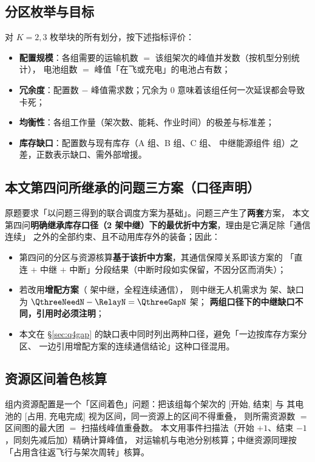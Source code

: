 \documentclass[12pt,a4paper,fontset=windows]{ctexart}
\begin{document}
\subsection{分区枚举与目标}
对 $K=2,3$ 枚举块的所有划分，按下述指标评价：
\begin{itemize}[leftmargin=2.2em,itemsep=2pt]
\item \textbf{配置规模}：各组需要的运输机数 $=$ 该组架次的峰值并发数（按机型分别统计），
      电池组数 $=$ 峰值「在飞或充电」的电池占有数；
\item \textbf{冗余度}：配置数 $-$ 峰值需求数；冗余为 0 意味着该组任何一次延误都会导致卡死；
\item \textbf{均衡性}：各组工作量（架次数、能耗、作业时间）的极差与标准差；
\item \textbf{库存缺口}：配置数与现有库存（A \TypeABat 组、B \TypeBBat 组、C \TypeCBat 组、
      中继能源组件 \RelayBat 组）之差，正数表示缺口、需外部增援。
\end{itemize}

\subsection{本文第四问所继承的问题三方案（口径声明）}\label{sec:q4inherit}
原题要求「以问题三得到的联合调度方案为基础」。问题三产生了\textbf{两套}方案，
本文第四问\textbf{明确继承库存口径（2 架中继）下的最优折中方案}，理由是它满足除「通信连续」
之外的全部约束、且不动用库存外的装备；因此：
\begin{itemize}[leftmargin=2.2em,itemsep=2pt]
\item 第四问的分区与资源核算\textbf{基于该折中方案}，其通信保障关系即该方案的
「直连 $+$ 中继 $+$ 中断」分段结果（中断时段如实保留，不因分区而消失）；
\item 若改用\textbf{增配方案}（\QthreeNeedN{} 架中继，全程连续通信），
则中继无人机需求为 \QthreeNeedN{} 架、缺口为 $\QthreeNeedN-\RelayN=\QthreeGapN$ 架；
\textbf{两组口径下的中继缺口不同，引用时必须注明}；
\item 本文在 \S\ref{sec:q4gap} 的缺口表中同时列出两种口径，避免「一边按库存方案分区、
一边引用增配方案的连续通信结论」这种口径混用。
\end{itemize}

\subsection{资源区间着色核算}
组内资源配置是一个「区间着色」问题：把该组每个架次的 [开始, 结束] 与
其电池的 [占用, 充电完成] 视为区间，同一资源上的区间不得重叠，
则所需资源数 $=$ 区间图的最大团 $=$ 扫描线峰值重叠数。
本文用事件扫描法（开始 $+1$、结束 $-1$，同刻先减后加）精确计算峰值，
对运输机与电池分别核算；中继资源同理按「占用含往返飞行与架次周转」核算。
\end{document}
